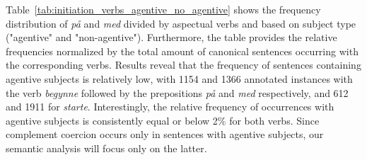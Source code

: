 \documentclass{article}
\begin{document}

Table~\ref{tab:initiation_verbs_agentive_no_agentive} shows the frequency distribution of \emph{på} and \emph{med} divided by aspectual verbs and based on subject type ("agentive" and "non-agentive"). Furthermore, the table provides the relative frequencies normalized by the total amount of canonical sentences occurring with the corresponding verbs.
Results reveal that the frequency of sentences containing agentive subjects is relatively low, with 1154 and 1366 annotated instances with the verb \emph{begynne} followed by the prepositions \emph{på} and \emph{med} respectively, and 612 and 1911 for \emph{starte}. Interestingly, the relative frequency of occurrences with agentive subjects is consistently equal or below 2\% for both verbs.
Since complement coercion occurs only in sentences with agentive subjects, our semantic analysis will focus only on the latter. 

\end{document}
